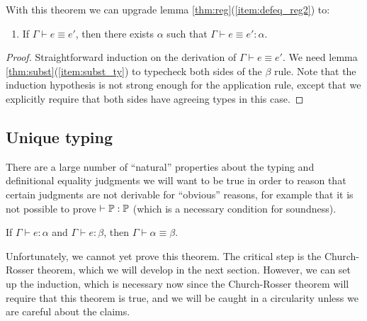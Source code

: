 With this theorem we can upgrade lemma \ref{thm:reg}(\ref{item:defeq_reg2}) to:
\begin{lemma}
\begin{enumerate}
\item If $\Gamma\vdash e\equiv e'$, then there exists $\alpha$ such that $\Gamma\vdash e\equiv e':\alpha$.
\end{enumerate}
\end{lemma}
\begin{proof}
Straightforward induction on the derivation of $\Gamma\vdash e\equiv e'$. We need lemma \ref{thm:subst}(\ref{item:subst_ty}) to typecheck both sides of the $\beta$ rule. Note that the induction hypothesis is not strong enough for the application rule, except that we explicitly require that both sides have agreeing types in this case.
\end{proof}

\subsection{Unique typing}\label{sec:unique}
There are a large number of ``natural'' properties about the typing and definitional equality judgments we will want to be true in order to reason that certain judgments are not derivable for ``obvious'' reasons, for example that it is not possible to prove $\vdash\P:\P$ (which is a necessary condition for soundness).

\begin{theorem}\label{thm:unique}
If $\Gamma\vdash e:\alpha$ and $\Gamma\vdash e:\beta$, then $\Gamma\vdash\alpha\equiv\beta$.
\end{theorem}

Unfortunately, we cannot yet prove this theorem. The critical step is the Church-Rosser theorem, which we will develop in the next section. However, we can set up the induction, which is necessary now since the Church-Rosser theorem will require that this theorem is true, and we will be caught in a circularity unless we are careful about the claims.

